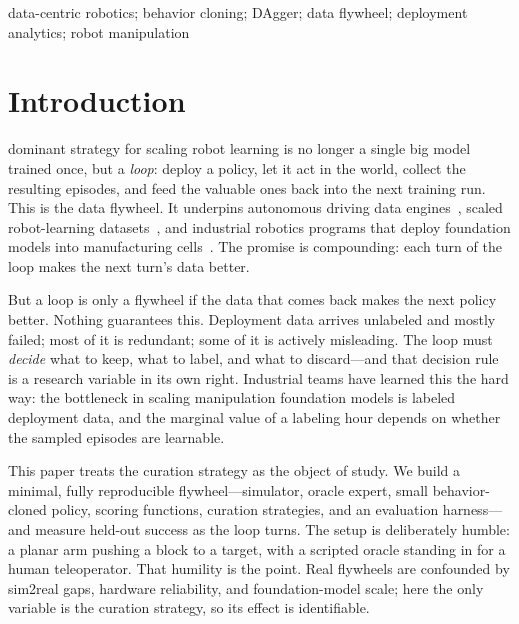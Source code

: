\documentclass[conference]{IEEEtran}
\begin{document}
\begin{abstract}
$\rightarrow$ \mixRescueFinal\ at ratio 0.25; low-capacity MLP:
flood-robust even on contact-rich MuJoCo dynamics), and a closed-loop
curator finds the stable operating point without knowing capacity. A DQN
trained from scratch
with a dense reward needs \dqnSteps\ environment interactions to reach
\dqnFinal\ success---versus the flywheel's \flywheelSteps. The effect also
survives a harder task, where relabeling still compounds while no feedback
stays flat.
We release the framework, a deterministic multi-seed study, and a
per-iteration \emph{flywheel report} that exposes success, progress,
smoothness, and state-coverage signals---the observability layer that real
deployment loops will need as they feed manipulation foundation models.
\end{abstract}

\begin{IEEEkeywords}
data-centric robotics; behavior cloning; DAgger; data flywheel;
deployment analytics; robot manipulation
\end{IEEEkeywords}

\section{Introduction}
 dominant strategy for scaling robot learning is no
longer a single big model trained once, but a \emph{loop}: deploy a policy,
let it act in the world, collect the resulting episodes, and feed the
valuable ones back into the next training run. This is the data flywheel.
It underpins autonomous driving data engines~\cite{karpathy2021tesla,sun2020waymo},
scaled robot-learning datasets~\cite{openx2024,droid2024}, and industrial
robotics programs that deploy foundation models into manufacturing
cells~\cite{mind2026}. The promise is compounding: each turn of the loop
makes the next turn's data better.

But a loop is only a flywheel if the data that comes back makes the next
policy better. Nothing guarantees this. Deployment data arrives unlabeled
and mostly failed; most of it is redundant; some of it is actively
misleading. The loop must \emph{decide} what to keep, what to label, and
what to discard---and that decision rule is a research variable in its own
right. Industrial teams have learned this the hard way: the bottleneck in
scaling manipulation foundation models is labeled deployment data, and the
marginal value of a labeling hour depends on whether the sampled episodes
are learnable.

This paper treats the curation strategy as the object of study. We build a
minimal, fully reproducible flywheel---simulator, oracle expert, small
behavior-cloned policy, scoring functions, curation strategies, and an
evaluation harness---and measure held-out success as the loop turns. The
setup is deliberately humble: a planar arm pushing a block to a target,
with a scripted oracle standing in for a human teleoperator. That humility
is the point. Real flywheels are confounded by sim2real gaps, hardware
reliability, and foundation-model scale; here the only variable is the
curation strategy, so its effect is identifiable.
\end{document}
